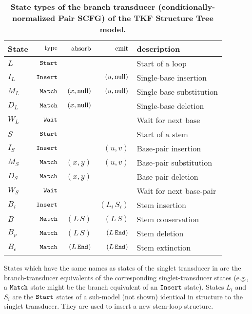\documentclass[10pt]{article}
\begin{document}
\begin{table}[!ht]
  \caption{
    \textbf{State types of the branch transducer
      (conditionally-normalized Pair SCFG) of the TKF Structure Tree
      model.}}
  \begin{tabular}{|l|rrrl|} \hline
    State & $\operatorname{type}$ & $\operatorname{absorb}$ & $\operatorname{emit}$ & description \\ \hline
    $L$ & $\mathtt{Start}$ & & & Start of a loop \\ \hline
    $I_L$ & $\mathtt{Insert}$ & & $(u,\mathrm{null})$ & Single-base insertion \\ \hline
    $M_L$ & $\mathtt{Match}$ & $(x,\mathrm{null})$ & $(u,\mathrm{null})$ & Single-base substitution \\ \hline
    $D_L$ & $\mathtt{Match}$ & $(x,\mathrm{null})$ & & Single-base deletion \\ \hline
    $W_L$ & $\mathtt{Wait}$ & & & Wait for next base \\ \hline \hline
    $S$ & $\mathtt{Start}$ & & & Start of a stem \\ \hline
    $I_S$ & $\mathtt{Insert}$ & & $(u,v)$ & Base-pair insertion \\ \hline
    $M_S$ & $\mathtt{Match}$ & $(x,y)$ & $(u,v)$ & Base-pair substitution \\ \hline
    $D_S$ & $\mathtt{Match}$ & $(x,y)$ & & Base-pair deletion \\ \hline
    $W_S$ & $\mathtt{Wait}$ & & & Wait for next base-pair \\ \hline \hline
    $B_i$ & $\mathtt{Insert}$ & & $(L_i\,S_i)$ & Stem insertion \\ \hline
    $B$ & $\mathtt{Match}$ & $(L\,S)$ & $(L\,S)$ & Stem conservation \\ \hline
    $B_p$ & $\mathtt{Match}$ & $(L\,S)$ & $(L\,\mathtt{End})$ & Stem deletion \\ \hline
    $B_e$ & $\mathtt{Match}$ & $(L\,\mathtt{End})$ & $(L\,\mathtt{End})$ & Stem extinction \\ \hline
  \end{tabular}
  \begin{flushleft}
    States which have the same names as states of the singlet transducer in 
    are the branch-transducer equivalents of the corresponding singlet-transducer states
    (e.g., a $\mathtt{Match}$ state might be the branch equivalent of an $\mathtt{Insert}$ state).
    States $L_i$ and $S_i$ are the $\mathtt{Start}$ states of a sub-model (not shown) identical
    in structure to the singlet transducer.  They are used to insert a
    new stem-loop structure.
  \end{flushleft}
\end{table}
\end{document}
